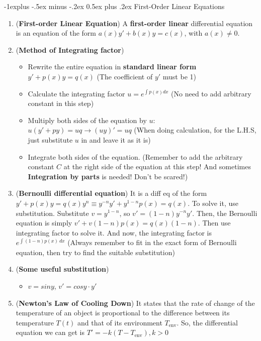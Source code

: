 \documentclass[10pt, landscape]{article}
\makeatletter
\renewcommand{\subsection}{\@startsection{subsection}{2}{0mm}%
                                {-1explus -.5ex minus -.2ex}%
                                {0.5ex plus .2ex}%
                                {\normalfont\normalsize\bfseries}}
\makeatother
\begin{document}
\begin{multicols}{4}
\subsection{First-Order Linear Equations}
\begin{enumerate}
    \item (\textbf{First-order Linear Equation}) A \textbf{first-order linear} differential equation is an equation of the form $a(x)y'+b(x)y=c(x)$, with $a(x)\neq 0$.
    \item (\textbf{Method of Integrating factor})
    \begin{itemize}
        \item Rewrite the entire equation in \textbf{standard linear form} $y'+p(x)y=q(x)$ (The coefficient of $y'$ must be 1)
        \item Calculate the integrating factor $u=e^{\int p(x)dx}$ (No need to add arbitrary constant in this step)
        \item Multiply both sides of the equation by $u$: $u(y'+py)=uq\rightarrow (uy)'=uq$ (When doing calculation, for the L.H.S, just substitute $u$ in and leave it as it is)
        \item Integrate both sides of the equation. (Remember to add the arbitrary constant $C$ at the right side of the equation at this step! And sometimes \textbf{Integration by parts} is needed! Don't be scared!)
    \end{itemize}
    \item (\textbf{Bernoulli differential equation}) It is a diff eq of the form $y'+p(x)y=q(x)y^n\equiv y^{-n}y'+y^{1-n}p(x)=q(x)$. To solve it, use substitution. Substitute $v=y^{1-n}$, so $v'=(1-n)y^{-n}y'$. Then, the Bernoulli equation is simply $v'+v(1-n)p(x)=q(x)(1-n)$. Then use integrating factor to solve it. And now, the integrating factor is $e^{\int (1-n)p(x)~dx}$ (Always remember to fit in the exact form of Bernoulli equation, then try to find the suitable substitution)
    \item (\textbf{Some useful substitution})
    \begin{itemize}
        \item $v=siny$, $v'=cosy\cdot y'$
    \end{itemize}
    \item (\textbf{Newton's Law of Cooling Down}) It states that the rate of change of the temperature of an object is proportional to the difference between its temperature $T(t)$ and that of its environment $T_{\text{env}}$. So, the differential equation we can get is $T'=-k(T-T_{\text{env}}),k>0$
\end{enumerate}

\end{multicols}
\end{document}
